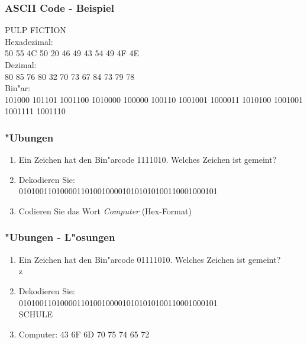 \documentclass{beamer}
\begin{document}
\frame
{
	\frametitle{ASCII Code - Beispiel}
	PULP FICTION\\
	\vspace{3mm}
	Hexadezimal:\\
	50 55 4C 50 20 46 49 43 54 49 4F 4E\\
	\vspace{3mm}
	Dezimal:\\
	80 85 76 80 32 70 73 67 84 73 79 78\\
	\vspace{3mm}
	Bin"ar:\\
	{\tiny 101000 101101 1001100 1010000 100000 100110  1001001 1000011 1010100 1001001 1001111 1001110}\\
}

\frame
{
	\frametitle{"Ubungen}
	\begin{enumerate}
	\item Ein Zeichen hat den Bin"arcode 1111010. Welches Zeichen ist gemeint?
	\item Dekodieren Sie:\\
	{\tiny 010100110100001101001000010101010100110001000101}
	\item Codieren Sie das Wort \emph{Computer} (Hex-Format)
	\end{enumerate}
}

\frame
{
	\frametitle{"Ubungen - L"osungen}
	\begin{enumerate}
	\item Ein Zeichen hat den Bin"arcode 01111010. Welches Zeichen ist gemeint?\\
	z
	\item Dekodieren Sie:\\
	{\tiny 010100110100001101001000010101010100110001000101}\\
	SCHULE
	\item Computer: 43 6F 6D 70 75 74 65 72
	\end{enumerate}
}
\end{document}
